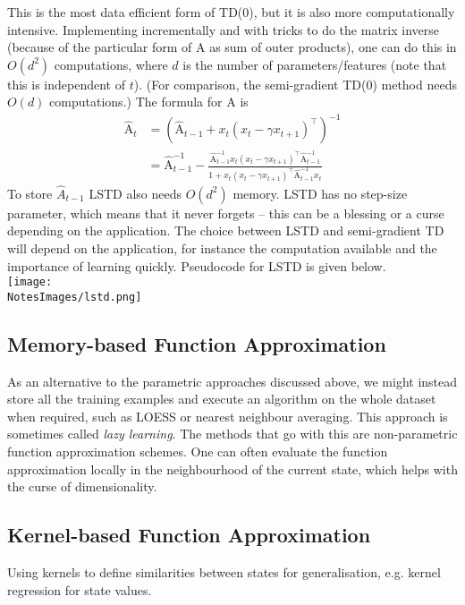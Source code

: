 This is the most data efficient form of TD(0), but it is also more computationally intensive. Implementing incrementally and with tricks to do the matrix inverse (because of the particular form of $\mathrm{A}$ as sum of outer products), one can do this in $O(d^2)$ computations, where $d$ is the number of parameters/features (note that this is independent of $t$). (For comparison, the semi-gradient TD(0) method needs $O(d)$ computations.) The formula for $\mathrm{A}$ is 
\begin{align}
    \hat{\mathrm{A}}_t &= \left(\hat{\mathrm{A}}_{t-1} + x_t ( x_t - \gamma x_{t+1})^\top\right)^{-1} \\ 
                      &= \hat{\mathrm{A}}_{t-1}^{-1} - \frac{\hat{\mathrm{A}}_{t-1}^{-1} x_t( x_t - \gamma x_{t+1})^\top \hat{\mathrm{A}}_{t-1}^{-1}}{1 + x_t ( x_t - \gamma x_{t+1})^\top \hat{\mathrm{A}}_{t-1}^{-1} x_t}
\end{align}
To store $\hat{A}_{t-1}$ LSTD also needs $O(d^2)$ memory. LSTD has no step-size parameter, which means that it never forgets -- this can be a blessing or a curse depending on the application. The choice between LSTD and semi-gradient TD will depend on the application, for instance the computation available and the importance of learning quickly. Pseudocode for LSTD is given below.\\

\texttt{[image: \\NotesImages/lstd.png]}\\


\subsection{Memory-based Function Approximation}
As an alternative to the parametric approaches discussed above, we might instead store all the training examples and execute an algorithm on the whole dataset when required, such as LOESS or nearest neighbour averaging. This approach is sometimes called \emph{lazy learning}. The methods that go with this are non-parametric function approximation schemes. One can often evaluate the function approximation locally in the neighbourhood of the current state, which helps with the curse of dimensionality.

\subsection{Kernel-based Function Approximation}
Using kernels to define similarities between states for generalisation, e.g. kernel regression for state values.

